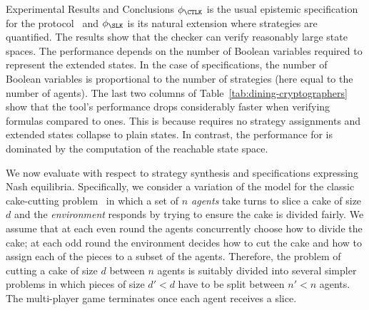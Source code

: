 \begin{section}{Experimental Results and Conclusions}
$\phi_{\CTLK}$ is the usual epistemic specification for the
protocol~\cite{MS04,LQR09} and $\phi_{\SLK}$ is its natural extension where
strategies are quantified.
The results show that the checker can verify reasonably large state spaces.
The performance depends on the number of Boolean variables required to represent
the extended states.
In the case of \SLK specifications, the number of Boolean variables is
proportional to the number of strategies (here equal to the number of agents).
The last two columns of Table~\ref{tab:dining-cryptographers} show that the
tool's performance drops considerably faster when verifying \SLK formulas
compared to \CTLK ones.
This is because \CTLK requires no strategy assignments and extended states
collapse to plain states.
In contrast, the performance for \CTLK is dominated by the computation of the
reachable state space.

We now evaluate \MCMASSLK  with respect to strategy synthesis and specifications
expressing Nash equilibria.
Specifically, we consider a variation of the model for the classic cake-cutting
problem~\cite{ES84} in which a set of \emph{$n$ agents} take turns to slice a
cake of size $d$ and the \emph{environment} responds by trying to ensure the
cake is divided fairly.
We assume that at each even round the agents concurrently choose how to divide
the cake; at each odd round the environment decides how to cut the cake and how
to assign each of the pieces to a subset of the agents.
Therefore, the problem of cutting a cake of size $d$ between $n$ agents is
suitably divided into several simpler problems in which pieces of size $d' < d$
have to be split between $n' < n$ agents.
The multi-player game terminates once each agent receives a slice.


\end{section}
